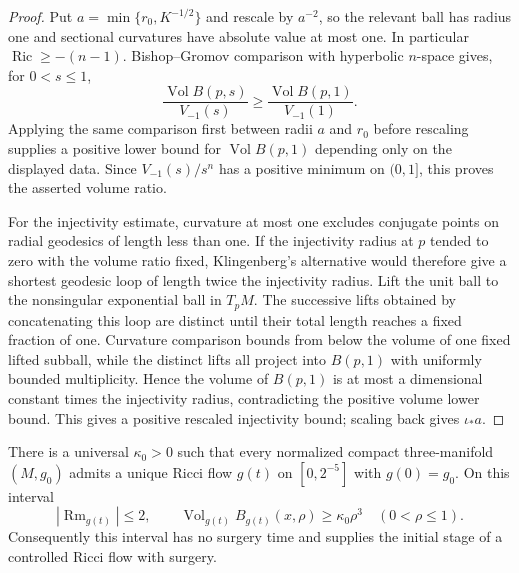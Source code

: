 \begin{proof}
Put $a=\min\{r_0,K^{-1/2}\}$ and rescale by $a^{-2}$, so the relevant
ball has radius one and sectional curvatures have absolute value at most one.
In particular $\operatorname{Ric}\ge-(n-1)$.  Bishop--Gromov comparison with
hyperbolic $n$-space gives, for $0<s\le1$,
\[
 \frac{\operatorname{Vol}B(p,s)}{V_{-1}(s)}
 \ge
 \frac{\operatorname{Vol}B(p,1)}{V_{-1}(1)}.
\]
Applying the same comparison first between radii $a$ and $r_0$ before
rescaling supplies a positive lower bound for
$\operatorname{Vol}B(p,1)$ depending only on the displayed data.  Since
$V_{-1}(s)/s^n$ has a positive minimum on $(0,1]$, this proves the asserted
volume ratio.

For the injectivity estimate, curvature at most one excludes conjugate points
on radial geodesics of length less than one.  If the injectivity radius at
$p$ tended to zero with the volume ratio fixed, Klingenberg's alternative
would therefore give a shortest geodesic loop of length twice the injectivity
radius.  Lift the unit ball to the nonsingular exponential ball in $T_pM$.
The successive lifts obtained by concatenating this loop are distinct until
their total length reaches a fixed fraction of one.  Curvature comparison
bounds from below the volume of one fixed lifted subball, while the distinct
lifts all project into $B(p,1)$ with uniformly bounded multiplicity.  Hence
the volume of $B(p,1)$ is at most a dimensional constant times the
injectivity radius, contradicting the positive volume lower bound.  This
gives a positive rescaled injectivity bound; scaling back gives $\iota_*a$.
\end{proof}

\begin{theorem}
\label{thm:normalized-short-time-ricci-flow}
\notready
There is a universal $\kappa_0>0$ such that every normalized compact
three-manifold $(M,g_0)$ admits a unique Ricci flow $g(t)$ on
$[0,2^{-5}]$ with $g(0)=g_0$.  On this interval
\[
 |\operatorname{Rm}_{g(t)}|\le2,
 \qquad
 \operatorname{Vol}_{g(t)}B_{g(t)}(x,\rho)\ge\kappa_0\rho^3
 \quad(0<\rho\le1).
\]
Consequently this interval has no surgery time and supplies the initial
stage of a controlled Ricci flow with surgery.
\end{theorem}

